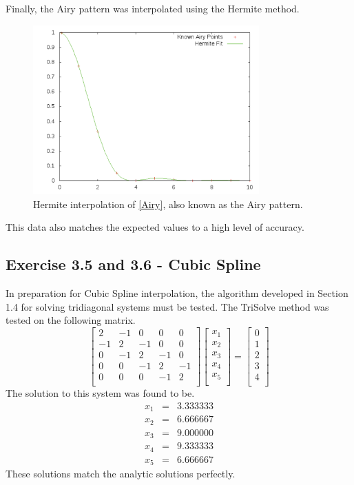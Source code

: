 \documentclass[12pt]{article}
\begin{document}
Finally, the Airy pattern was interpolated using the Hermite method.  
\begin{figure}[h!]
\centering
\includegraphics[width =120 mm, height = 65mm]{Ex_3_4_airy.pdf}
\caption{Hermite interpolation of \eqref{Airy}, also known as the Airy pattern.}
\label{fig:3.4.airy}
\end{figure}
This data also matches the expected values to a high level of accuracy.  
\subsection{Exercise 3.5 and 3.6 - Cubic Spline}
In preparation for Cubic Spline interpolation, the algorithm developed in Section 1.4 for solving tridiagonal systems must be tested.  The TriSolve method was tested on the following matrix.
\[
\begin{bmatrix}
2 & -1&0 &0 &0 \\
-1 &2& -1 &0& 0 \\
 0& -1& 2& -1&0 \\
0 &0 &-1 & 2 & -1 \\
0&0 &0 &-1 & 2 \\
\end{bmatrix}
\begin{bmatrix}
x_1\\
x_2\\
x_3\\
x_4 \\
x_5 \\ 
\end{bmatrix}
=
\begin{bmatrix}
0\\
1\\
2 \\
3 \\
4 \\
\end{bmatrix}
 \]
The solution to this system was found to be.
\begin{eqnarray}
\label{3.5}
x_1 &=& 3.333333 \nonumber \\
x_2 &=& 6.666667\nonumber \\
x_3 &=& 9.000000\nonumber \\
x_4 &=& 9.333333\nonumber \\
x_5 &=& 6.666667
\end{eqnarray}
These solutions match the analytic solutions perfectly.
\end{document}
